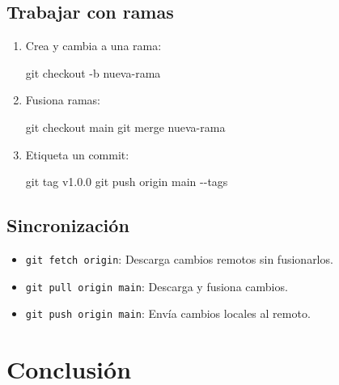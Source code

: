 \documentclass[
  doc,
  floatsintext,
  longtable,
  a4paper,
  nolmodern,
  notxfonts,
  notimes,
  colorlinks=true,linkcolor=blue,citecolor=blue,urlcolor=blue]{apa7}
\newenvironment{Shaded}{\begin{snugshade}}{\end{snugshade}}
\newcommand{\AttributeTok}[1]{\textcolor[rgb]{0.40,0.45,0.13}{#1}}
\newcommand{\FunctionTok}[1]{\textcolor[rgb]{0.28,0.35,0.67}{#1}}
\newcommand{\NormalTok}[1]{\textcolor[rgb]{0.00,0.23,0.31}{#1}}
\providecommand{\tightlist}{%
  \setlength{\itemsep}{0pt}\setlength{\parskip}{0pt}}
\begin{document}
\subsection{Trabajar con ramas}\label{trabajar-con-ramas}

\begin{enumerate}
\def\labelenumi{\arabic{enumi}.}
\item
  Crea y cambia a una rama:

\begin{Shaded}
\begin{Highlighting}[]
\FunctionTok{git}\NormalTok{ checkout }\AttributeTok{{-}b}\NormalTok{ nueva{-}rama}
\end{Highlighting}
\end{Shaded}
\item
  Fusiona ramas:

\begin{Shaded}
\begin{Highlighting}[]
\FunctionTok{git}\NormalTok{ checkout main}
\FunctionTok{git}\NormalTok{ merge nueva{-}rama}
\end{Highlighting}
\end{Shaded}
\item
  Etiqueta un commit:

\begin{Shaded}
\begin{Highlighting}[]
\FunctionTok{git}\NormalTok{ tag v1.0.0}
\FunctionTok{git}\NormalTok{ push origin main }\AttributeTok{{-}{-}tags}
\end{Highlighting}
\end{Shaded}
\end{enumerate}

\subsection{Sincronización}\label{sincronizaciuxf3n}

\begin{itemize}
\tightlist
\item
  \texttt{git\ fetch\ origin}: Descarga cambios remotos sin fusionarlos.
\item
  \texttt{git\ pull\ origin\ main}: Descarga y fusiona cambios.
\item
  \texttt{git\ push\ origin\ main}: Envía cambios locales al remoto.
\end{itemize}

\section{Conclusión}\label{conclusiuxf3n}
\end{document}
